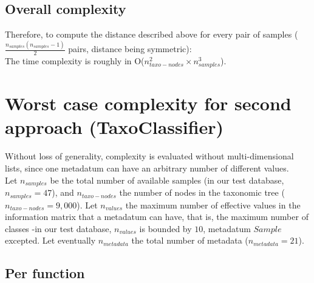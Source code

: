 \documentclass{report}
\begin{document}
\subsection{Overall complexity}

Therefore, to compute the distance described above for every pair of samples ($\frac{n_{samples}(n_{samples} - 1)}{2}$ pairs, distance being symmetric):\\

The time complexity is roughly in O($n_{taxo-nodes}^{2} \times n_{samples}^{3}$).

\section{Worst case complexity for second approach (TaxoClassifier)}

Without loss of generality, complexity is evaluated without multi-dimensional lists, since one metadatum can have an arbitrary number of different values.\\

Let $n_{samples}$ be the total number of available samples (in our test database, $n_{samples} = 47$), and $n_{taxo-nodes}$ the number of nodes in the taxonomic tree ($n_{taxo-nodes} = 9,000$). Let $n_{values}$ the maximum number of effective values in the information matrix that a metadatum can have, that is, the maximum number of classes -in our test database, $n_{values}$ is bounded by $10$, metadatum $Sample$ excepted. Let eventually $n_{metadata}$ the total number of metadata ($n_{metadata} = 21$). 

\subsection{Per function}
\end{document}
